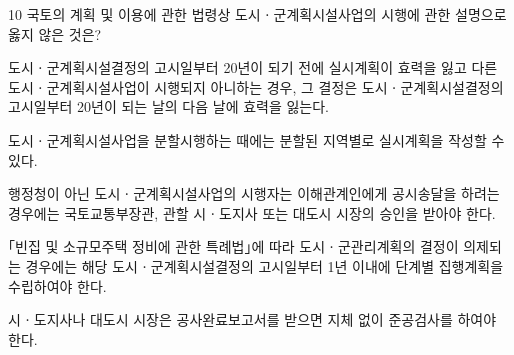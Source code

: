 \begin{question}{10}
국토의 계획 및 이용에 관한 법령상 도시ㆍ군계획시설사업의 시행에 관한 설명으로 옳지 않은 것은?
\begin{choices}
  \item 도시ㆍ군계획시설결정의 고시일부터 20년이 되기 전에 실시계획이 효력을 잃고 다른 도시ㆍ군계획시설사업이 시행되지 아니하는 경우, 그 결정은 도시ㆍ군계획시설결정의 고시일부터 20년이 되는 날의 다음 날에 효력을 잃는다.
  \item 도시ㆍ군계획시설사업을 분할시행하는 때에는 분할된 지역별로 실시계획을 작성할 수 있다.
  \item 행정청이 아닌 도시ㆍ군계획시설사업의 시행자는 이해관계인에게 공시송달을 하려는 경우에는 국토교통부장관, 관할 시ㆍ도지사 또는 대도시 시장의 승인을 받아야 한다.
  \item ｢빈집 및 소규모주택 정비에 관한 특례법｣에 따라 도시ㆍ군관리계획의 결정이 의제되는 경우에는 해당 도시ㆍ군계획시설결정의 고시일부터 1년 이내에 단계별 집행계획을 수립하여야 한다.
  \item 시ㆍ도지사나 대도시 시장은 공사완료보고서를 받으면 지체 없이 준공검사를 하여야 한다.
\end{choices}
\end{question}
